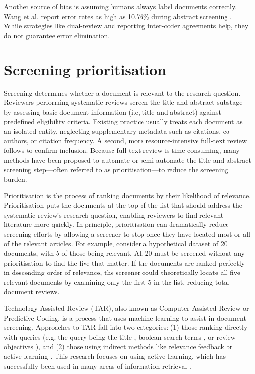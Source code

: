 \documentclass[10pt,oneside]{book}
\begin{document}
Another source of bias is assuming humans always label documents correctly. Wang et al. report error rates as high as 10.76\% during abstract screening \cite{wang_error_2020}. While strategies like dual-review and reporting inter-coder agreements help, they do not guarantee error elimination.

\newpage
\section{Screening prioritisation} \label{sec:screening Priorisation}

Screening determines whether a document is relevant to the research question. Reviewers performing systematic reviews screen the title and abstract substage by assessing basic document information (i.e, title and abstract) against predefined eligibility criteria. Existing practice usually treats each document as an isolated entity, neglecting supplementary metadata such as citations, co-authors, or citation frequency.  A second, more resource-intensive full-text review follows to confirm inclusion. Because full-text review is time-consuming, many methods have been proposed to automate or semi-automate the title and abstract screening step—often referred to as prioritisation—to reduce the screening burden.

Prioritisation is the process of ranking documents by their likelihood of relevance. Prioritisation puts the documents at the top of the list that should address the systematic review's research question, enabling reviewers to find relevant literature more quickly. In principle, prioritisation can dramatically reduce screening efforts by allowing a screener to stop once they have located most or all of the relevant articles. For example, consider a hypothetical dataset of 20 documents, with 5 of those being relevant. All 20 must be screened without any prioritisation to find the five that matter. If the documents are ranked perfectly in descending order of relevance, the screener could theoretically locate all five relevant documents by examining only the first 5 in the list, reducing total document reviews. 

Technology-Assisted Review (TAR), also known as Computer-Assisted Review or Predictive Coding, is a process that uses machine learning to assist in document screening. Approaches to TAR fall into two categories: (1) those ranking directly with queries (e.g. the query being the title \cite{alharbi_ranking_2017, alharbi_retrieving_2018}, boolean search terms  \cite{alharbi_ranking_2017, alharbi_retrieving_2018, alharbi_ranking_2019}, or review objectives \cite{ferro_qut_2017, scells_integrating_2017}), and (2) those using indirect methods like relevance feedback \cite{alharbi_ranking_2019} or active learning \cite{cormack_technology-assisted_2017, cormack_systems_2019, grossman_technology-assisted_2010, grossman_automatic_2017}. This research focuses on using active learning, which has successfully been used in many areas of information retrieval \cite{cormack_autonomy_2015, cormack_engineering_2016, yu_fast2_2019, yu_finding_2018, miwa_reducing_2014}.
\end{document}
